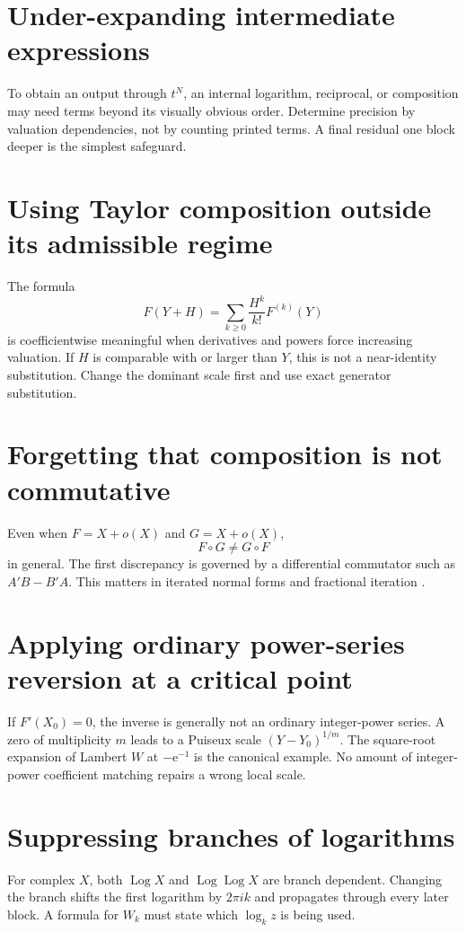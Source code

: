 \documentclass[11pt,oneside]{book}
\theoremstyle{definition}
\theoremstyle{remark}
\DeclareMathOperator{\Log}{Log}
\newcommand{\e}{\mathrm e}
\newcommand{\compose}{\mathbin{\circ}}
\begin{document}
\section{Under-expanding intermediate expressions}
To obtain an output through $t^N$, an internal logarithm, reciprocal, or
composition may need terms beyond its visually obvious order. Determine
precision by valuation dependencies, not by counting printed terms.
A final residual one block deeper is the simplest safeguard.

\section{Using Taylor composition outside its admissible regime}
The formula
\[
 F(Y+H)=\sum_{k\ge0}\frac{H^k}{k!}F^{(k)}(Y)
\]
is coefficientwise meaningful when derivatives and powers force increasing
valuation. If $H$ is comparable with or larger than $Y$, this is not a
near-identity substitution. Change the dominant scale first and use exact
generator substitution.

\section{Forgetting that composition is not commutative}
Even when $F=X+o(X)$ and $G=X+o(X)$,
\[
 F\compose G\ne G\compose F
\]
in general. The first discrepancy is governed by a differential
commutator such as $A'B-B'A$. This matters in iterated normal forms and
fractional iteration \cite{EdgarFractional}.

\section{Applying ordinary power-series reversion at a critical point}
If $F'(X_0)=0$, the inverse is generally not an ordinary integer-power
series. A zero of multiplicity $m$ leads to a Puiseux scale
$(Y-Y_0)^{1/m}$. The square-root expansion of Lambert $W$ at
$-\e^{-1}$ is the canonical example. No amount of integer-power
coefficient matching repairs a wrong local scale.

\section{Suppressing branches of logarithms}
For complex $X$, both $\Log X$ and $\Log\Log X$ are branch dependent.
Changing the branch shifts the first logarithm by $2\pi i k$ and propagates
through every later block. A formula for $W_k$ must state which
$\log_k z$ is being used.
\end{document}
